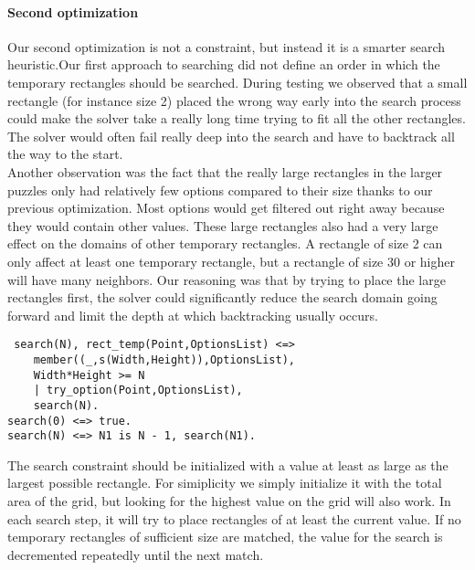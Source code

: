 \paragraph{Second optimization}
Our second optimization is not a constraint, but instead it is a smarter search heuristic.Our first approach to searching did not define an order in which the temporary rectangles should be searched. During testing we observed that a small rectangle (for instance size 2) placed the wrong way early into the search process could make the solver take a really long time trying to fit all the other rectangles. The solver would often fail really deep into the search and have to backtrack all the way to the start. \\
 Another observation was the fact that the really large rectangles in the larger puzzles only had relatively few options compared to their size thanks to our previous optimization. Most options would get filtered out right away because they would contain other values. These large rectangles also had a very large effect on the domains of other temporary rectangles. A rectangle of size 2 can only affect at least one temporary rectangle, but a rectangle of size 30 or higher will have many neighbors. Our reasoning was that by trying to place the large rectangles first, the solver could significantly reduce the search domain going forward and limit the depth at which backtracking usually occurs.
 \begin{lstlisting}
 search(N), rect_temp(Point,OptionsList) <=>
	member((_,s(Width,Height)),OptionsList),
	Width*Height >= N
	| try_option(Point,OptionsList),
	search(N).
search(0) <=> true.
search(N) <=> N1 is N - 1, search(N1).
\end{lstlisting}
The search constraint should be initialized with a value at least as large as the largest possible rectangle. For simiplicity we simply initialize it with the total area of the grid, but looking for the highest value on the grid will also work. In each search step, it will try to place rectangles of at least the current value. If no temporary rectangles of sufficient size are matched, the value for the search is decremented repeatedly until the next match. \\

